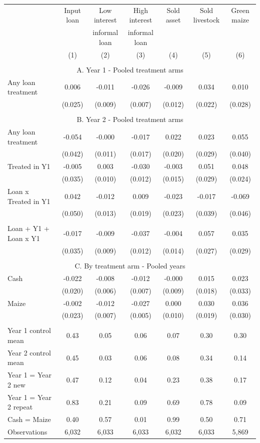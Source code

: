 \begin{tabular}{l cc cc cc}
\hline
 & Input loan & Low interest & High interest & Sold asset & Sold livestock & Green maize \\ 
 & & informal loan & informal loan & & &  \\ 
 & (1) & (2) & (3) & (4) & (5) & (6)  \\ 
\hline
 \\ 
\multicolumn{7}{c}{A. Year 1 - Pooled treatment arms} \\ 
Any loan treatment & 0.006 & -0.011 & -0.026 & -0.009 & 0.034 & 0.010 \\
 & (0.025) & (0.009) & (0.007) & (0.012) & (0.022) & (0.028) \\
 \\ 
\multicolumn{7}{c}{B. Year 2 - Pooled treatment arms} \\ 
Any loan treatment & -0.054 & -0.000 & -0.017 & 0.022 & 0.023 & 0.055 \\
 & (0.042) & (0.011) & (0.017) & (0.020) & (0.029) & (0.040) \\
Treated in Y1 & -0.005 & 0.003 & -0.030 & -0.003 & 0.051 & 0.048 \\
 & (0.035) & (0.010) & (0.012) & (0.015) & (0.029) & (0.024) \\
Loan x Treated in Y1 & 0.042 & -0.012 & 0.009 & -0.023 & -0.017 & -0.069 \\
 & (0.050) & (0.013) & (0.019) & (0.023) & (0.039) & (0.046) \\
 \\ 
Loan + Y1 + Loan x Y1 & -0.017 & -0.009 & -0.037 & -0.004 & 0.057 & 0.035 \\
 & (0.035) & (0.009) & (0.012) & (0.014) & (0.027) & (0.029) \\
 \\ 
\multicolumn{7}{c}{C. By treatment arm - Pooled years} \\ 
Cash & -0.022 & -0.008 & -0.012 & -0.000 & 0.015 & 0.023 \\
 & (0.020) & (0.006) & (0.007) & (0.009) & (0.018) & (0.033) \\
Maize & -0.002 & -0.012 & -0.027 & 0.000 & 0.030 & 0.036 \\
 & (0.023) & (0.007) & (0.005) & (0.010) & (0.019) & (0.030) \\
 \\ 
\hline
Year 1 control mean & 0.43 & 0.05 & 0.06 & 0.07 & 0.30 & 0.30 \\
Year 2 control mean & 0.45 & 0.03 & 0.06 & 0.08 & 0.34 & 0.14 \\
Year 1 = Year 2 new & 0.47 & 0.12 & 0.04 & 0.23 & 0.38 & 0.17 \\
Year 1 = Year 2 repeat & 0.83 & 0.21 & 0.09 & 0.69 & 0.78 & 0.09 \\
Cash = Maize & 0.40 & 0.57 & 0.01 & 0.99 & 0.50 & 0.71 \\
Observations &     6,032 &     6,033 &     6,033 &     6,032 &     6,033 &     5,869 \\
\hline
\end{tabular}
